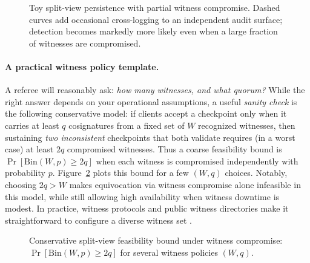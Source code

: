 \documentclass[11pt]{article}
\begin{document}
\begin{figure}[t]
\centering
{}
\caption{Toy split-view persistence with partial witness compromise.
Dashed curves add occasional cross-logging to an independent audit surface; detection becomes markedly more likely even when a large fraction of witnesses are compromised.}
\label{fig:crosslog_comp}

\end{figure}



\paragraph{A practical witness policy template.}
A referee will reasonably ask: \emph{how many witnesses, and what quorum?}
While the right answer depends on your operational assumptions, a useful \emph{sanity check} is the following conservative model:
if clients accept a checkpoint only when it carries at least $q$ cosignatures from a fixed set of $W$ recognized witnesses,
then sustaining \emph{two inconsistent} checkpoints that both validate requires (in a worst case) at least $2q$ compromised witnesses.
Thus a coarse feasibility bound is $\Pr[\mathrm{Bin}(W,p)\ge 2q]$ when each witness is compromised independently with probability $p$.
Figure~\ref{fig:witness_quorum} plots this bound for a few $(W,q)$ choices.
Notably, choosing $2q>W$ makes equivocation via witness compromise alone infeasible in this model, while still allowing high availability when witness downtime is modest.
In practice, witness protocols and public witness directories make it straightforward to configure a diverse witness set \cite{c2sp_tlog_witness}.

\begin{figure}[t]
\centering
{}
\caption{Conservative split-view feasibility bound under witness compromise: $\Pr[\mathrm{Bin}(W,p)\ge 2q]$ for several witness policies $(W,q)$.}
\label{fig:witness_quorum}
\end{figure}
\end{document}
